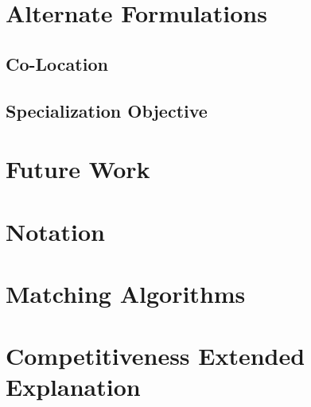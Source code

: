\documentclass{article}
\begin{document}


\section{Alternate Formulations}



\subsection{Co-Location}



\subsection{Specialization Objective}



\section{Future Work}



\newpage

\appendix
\appendixpage
\addappheadtotoc

\section{Notation}



\section{Matching Algorithms}
\label{Matching}



\section{Competitiveness Extended Explanation}
\label{Competitiveness_Extended}



\end{document}
